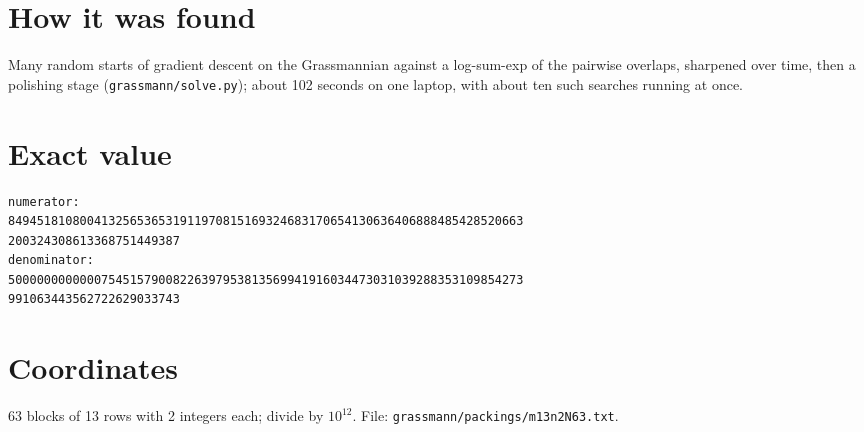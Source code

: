 \documentclass[11pt,a4paper]{article}
\begin{document}
\section{How it was found}
Many random starts of gradient descent on the Grassmannian against a log-sum-exp of the pairwise overlaps, sharpened over time, then a polishing stage (\texttt{grassmann/solve.py}); about 102 seconds on one laptop, with about ten such searches running at once.


\appendix
\section{Exact value}
{\small
\begin{verbatim}
numerator:
849451810800413256536531911970815169324683170654130636406888485428520663
200324308613368751449387
denominator:
500000000000075451579008226397953813569941916034473031039288353109854273
991063443562722629033743
\end{verbatim}}

\section{Coordinates}
63 blocks of 13 rows with 2 integers each; divide by $10^{12}$. File: \texttt{grassmann/packings/m13n2N63.txt}.
{\tiny
\begin{multicols}{4}
\end{multicols}}
\end{document}
